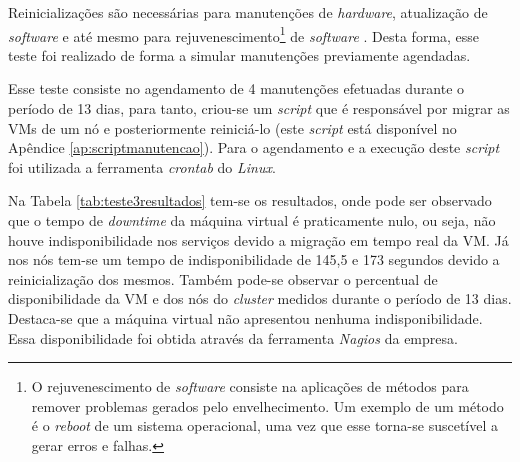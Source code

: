 Reinicializações são necessárias para manutenções de \textit{hardware}, atualização de \textit{software} e até mesmo para 
rejuvenescimento\footnote{O rejuvenescimento de \textit{software} consiste na aplicações de métodos para remover problemas gerados pelo 
envelhecimento. Um exemplo de um método é o \textit{reboot} de um sistema operacional, uma vez que esse torna-se suscetível a gerar erros e 
falhas.} de \textit{software} \cite{melo2014}. Desta forma, esse teste foi realizado de forma a simular manutenções previamente agendadas.



Esse teste consiste no agendamento de 4 manutenções efetuadas durante o período de 13 dias, para tanto, criou-se um \textit{script} que é 
responsável por migrar as \acp{VM} de um nó e posteriormente reiniciá-lo (este \textit{script} está disponível no Apêndice 
\ref{ap:scriptmanutencao}). Para o agendamento e a execução deste \textit{script} foi utilizada a ferramenta \textit{crontab} do \textit{Linux}. 

Na Tabela \ref{tab:teste3resultados} tem-se os resultados, onde pode ser observado que o tempo de \textit{downtime} da máquina virtual 
é praticamente nulo, ou seja, não houve indisponibilidade nos serviços devido a migração em tempo real da \ac{VM}. 
Já nos nós tem-se um tempo de indisponibilidade de 145,5 e 173 segundos devido a reinicialização dos mesmos.
Também pode-se observar o percentual de disponibilidade da \ac{VM} e dos nós do \textit{cluster} medidos durante o período de 13 dias.
Destaca-se que a máquina virtual não apresentou nenhuma indisponibilidade. Essa disponibilidade foi obtida através da ferramenta 
\textit{Nagios} \cite{nagios} da empresa.

